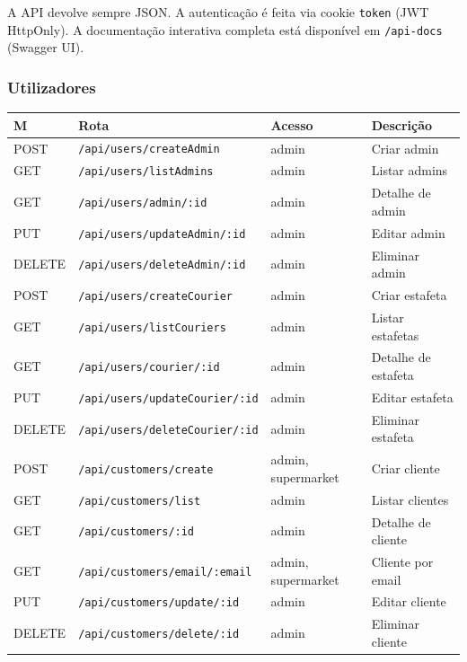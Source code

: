 \documentclass[12pt,a4paper]{article}
\begin{document}
A API devolve sempre JSON. A autenticação é feita via cookie \texttt{token} (JWT HttpOnly). A documentação interativa completa está disponível em \texttt{/api-docs} (Swagger UI).

\subsubsection{Utilizadores}

\begin{center}
\begin{tabular}{llll}
\toprule
\textbf{M} & \textbf{Rota} & \textbf{Acesso} & \textbf{Descrição} \\
\midrule
POST   & \texttt{/api/users/createAdmin}       & admin & Criar admin \\
GET    & \texttt{/api/users/listAdmins}        & admin & Listar admins \\
GET    & \texttt{/api/users/admin/:id}         & admin & Detalhe de admin \\
PUT    & \texttt{/api/users/updateAdmin/:id}   & admin & Editar admin \\
DELETE & \texttt{/api/users/deleteAdmin/:id}   & admin & Eliminar admin \\
\midrule
POST   & \texttt{/api/users/createCourier}     & admin & Criar estafeta \\
GET    & \texttt{/api/users/listCouriers}      & admin & Listar estafetas \\
GET    & \texttt{/api/users/courier/:id}       & admin & Detalhe de estafeta \\
PUT    & \texttt{/api/users/updateCourier/:id} & admin & Editar estafeta \\
DELETE & \texttt{/api/users/deleteCourier/:id} & admin & Eliminar estafeta \\
\midrule
POST   & \texttt{/api/customers/create}        & admin, supermarket & Criar cliente \\
GET    & \texttt{/api/customers/list}          & admin & Listar clientes \\
GET    & \texttt{/api/customers/:id}           & admin & Detalhe de cliente \\
GET    & \texttt{/api/customers/email/:email}  & admin, supermarket & Cliente por email \\
PUT    & \texttt{/api/customers/update/:id}    & admin & Editar cliente \\
DELETE & \texttt{/api/customers/delete/:id}    & admin & Eliminar cliente \\
\bottomrule
\end{tabular}
\end{center}
\end{document}
